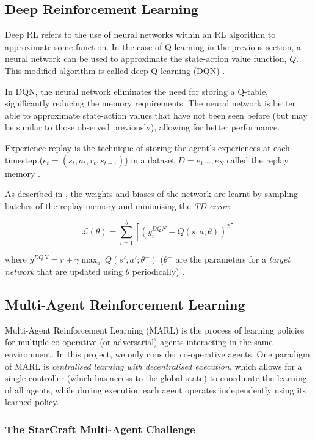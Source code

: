 \subsection{Deep Reinforcement Learning}

Deep RL refers to the use of neural networks within an RL algorithm to approximate some function. In the case of Q-learning in the previous section, a neural network can be used to approximate the state-action value function, $Q$. This modified algorithm is called deep Q-learning (DQN) \cite{dqn}.

In DQN, the neural network eliminates the need for storing a Q-table, significantly reducing the memory requirements. The neural network is better able to approximate state-action values that have not been seen before (but may be similar to those observed previously), allowing for better performance.

Experience replay \cite{expeirnecereplay} is the technique of storing the agent's experiences at each timestep ($e_t = (s_t, a_t, r_t, s_{t+1})$) in a dataset $D = e_1..., e_N$ called the replay memory \cite{dqn}.

As described in \cite{qmixcite}, the weights and biases of the network are learnt by sampling batches of the replay memory and minimising the \textit{TD error}:

\[\mathscr{L}(\theta)=\sum_{i=1}^{b}[(y_i^{DQN}-Q(s,a;\theta))^2]\]

where $y^{DQN}=r+\gamma \max_{a'}Q(s',a';\theta^-)$ ($\theta^-$ are the parameters for a \textit{target network} that are updated using $\theta$ periodically) \cite{qmixcite}.



\subsection{Multi-Agent Reinforcement Learning}
Multi-Agent Reinforcement Learning (MARL) is the process of learning policies for multiple co-operative (or adversarial) agents interacting in the same environment. In this project, we only consider co-operative agents. One paradigm of MARL is \textit{centralised learning with decentralised execution}, which allows for a single controller (which has access to the global state) to coordinate the learning of all agents, while during execution each agent operates independently using its learned policy.

\subsubsection{The StarCraft Multi-Agent Challenge}

